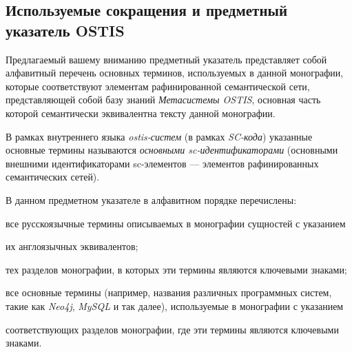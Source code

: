 \begin{partbacktext}
\part*{Используемые сокращения и предметный указатель OSTIS}
\label{part_glossary}

Предлагаемый вашему вниманию предметный указатель представляет собой алфавитный перечень основных терминов, используемых в данной монографии, которые  соответствуют элементам рафинированной семантической сети, представляющей собой базу знаний \textit{Метасистемы OSTIS}, основная часть которой семантически эквивалентна тексту данной монографии.

В рамках внутреннего языка \textit{ostis-систем} (в рамках \textit{SC-кода}) указанные основные термины называются \textit{основными sc-идентификаторами} (основными внешними идентификаторами sc-элементов --- элементов рафинированных семантических сетей).


В данном предметном указателе в алфавитном порядке перечислены:
\begin{textitemize}
	\item все русскоязычные  термины описываемых в монографии сущностей с указанием
	\begin{textitemize}
		\item их англоязычных эквивалентов;
		\item тех разделов монографии, в которых эти термины являются ключевыми знаками;
	\end{textitemize}
	\item все  основные термины (например, названия различных программных систем, такие как \textit{Neo4j}, \textit{MySQL} и так далее), используемые в монографии с указанием
	\begin{textitemize}
		\item соответствующих разделов монографии, где эти термины являются ключевыми знаками.
	\end{textitemize}
\end{textitemize}


\end{partbacktext}
